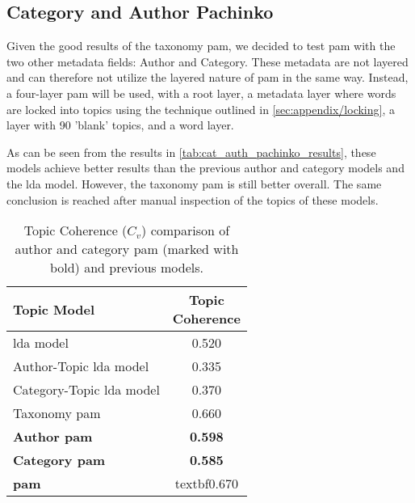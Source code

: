 \subsection{Category and Author Pachinko}\label{app:cat_auth_pachinko}
Given the good results of the taxonomy \gls{pam}, we decided to test \gls{pam} with the two other metadata fields: Author and Category.
These metadata are not layered and can therefore not utilize the layered nature of \gls{pam} in the same way.
Instead, a four-layer \gls{pam} will be used, with a root layer, a metadata layer where words are locked into topics using the technique outlined in \autoref{sec:appendix/locking}, a layer with 90 'blank' topics, and a word layer.

As can be seen from the results in \autoref{tab:cat_auth_pachinko_results}, these models achieve better results than the previous author and category models and the \gls{lda} model.
However, the taxonomy \gls{pam} is still better overall.
The same conclusion is reached after manual inspection of the topics of these models.

\begin{table}[h]
	\centering
	\caption{Topic Coherence ($C_v$) comparison of author and category \gls{pam} (marked with bold) and previous models.}
	\begin{tabular}{l|c}
		Topic Model & \makecell{Topic \\ Coherence} \\
		\midrule
		\acrfull{lda} model & 0.520 \\
		Author-Topic \acrlong{lda} model & 0.335 \\
		Category-Topic \acrlong{lda} model & 0.370 \\
		Taxonomy \acrlong{pam} & 0.660 \\
		\textbf{Author \acrlong{pam}} & \textbf{0.598} \\
		\textbf{Category \acrlong{pam}} & \textbf{0.585} \\
		\textbf{\acrlong{pam}} & textbf{0.670}
	\end{tabular}
	\label{tab:cat_auth_pachinko_results}
\end{table}


